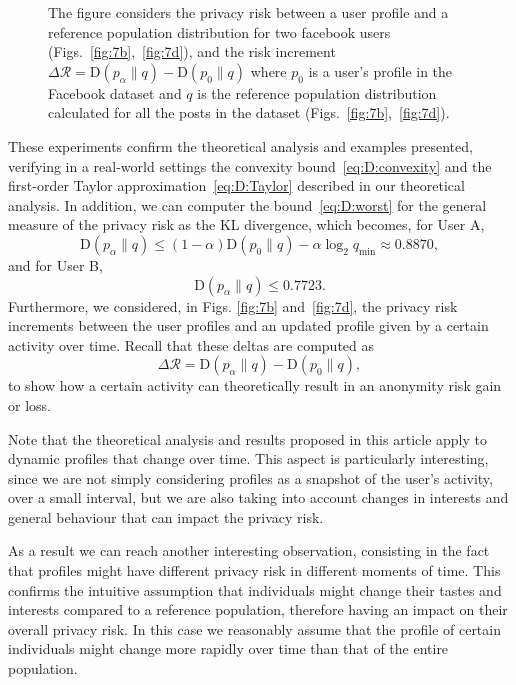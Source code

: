 \begin{figure}[htb]
{		\label{fig:7d}}
	\caption{The figure considers the privacy risk between a user profile and a reference population distribution for two facebook users (Figs.~\ref{fig:7b},~\ref{fig:7d}), and the risk increment $\Delta\mathcal{R} = \mathrm{D}(p_\alpha\|q) - \mathrm{D}(p_0\|q)$ where $p_0$ is a user's profile in the Facebook dataset and $q$ is the reference population distribution calculated for all the posts in the dataset (Figs.~\ref{fig:7b},~\ref{fig:7d}).}
	\label{fig:7}
\end{figure}

These experiments confirm the theoretical analysis and examples presented, verifying in a real-world settings the convexity bound~\eqref{eq:D:convexity} and the first-order Taylor approximation~\eqref{eq:D:Taylor} described in our theoretical analysis. In addition, we can computer the bound~\eqref{eq:D:worst} for the general measure of the privacy risk as the KL divergence, which becomes, for User A,
$$\mathrm{D}(p_\alpha\|q) \leqslant (1-\alpha) \mathrm{D}(p_0\|q) - \alpha \log_2 q_\mathrm{min} \approx 0.8870,$$
and for User B,
$$\mathrm{D}(p_\alpha\|q) \leqslant 0.7723.$$
Furthermore, we considered, in Figs. \ref{fig:7b} and~\ref{fig:7d}, the privacy risk increments between the user profiles and an updated profile given by a certain activity over time. Recall that these deltas are computed as 
$$\Delta\mathcal{R} = \mathrm{D}(p_\alpha\|q) - \mathrm{D}(p_0\|q),$$
to show how a certain activity can theoretically result in an anonymity risk gain or loss.

Note that the theoretical analysis and results proposed in this article apply to dynamic profiles that change over time. This aspect is particularly interesting, since we are not simply considering profiles as a snapshot of the user's activity, over a small interval, but we are also taking into account changes in interests and general behaviour that can impact the privacy risk.

As a result we can reach another interesting observation, consisting in the fact that profiles might have different privacy risk in different moments of time. This confirms the intuitive assumption that individuals might change their tastes and interests compared to a reference population, therefore having an impact on their overall privacy risk. In this case we reasonably assume that the profile of certain individuals might change more rapidly over time than that of the entire population.


